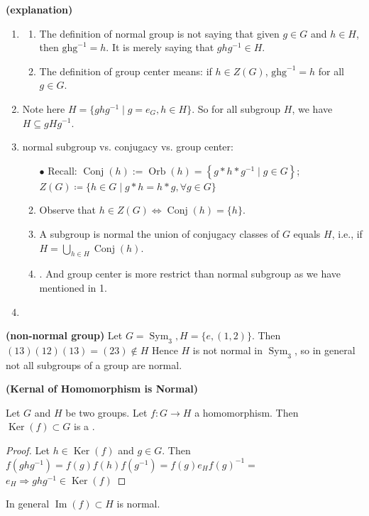 \documentclass{article}
\newcommand{\bfs}[1]{\textbf{({#1}) }}
\newcommand{\Sym}{\operatorname{Sym}}
\newcommand{\Ker}{\operatorname{Ker}}
\newcommand{\Conj}{\operatorname{Conj}}
\begin{document}
\begin{rema}{\bfs{explanation}} \label{rem:idbndadf}

\begin{enumerate} 
    \item \begin{enumerate}
        \item The definition of normal group is not saying that given $g \in G$ and $h \in H$, then $\mathrm{ghg}^{-1}=h$. It is merely saying that  $ghg^{-1} \in H .$ 
\item The definition of  group center means: if $h\in Z(G)$, $\mathrm{ghg}^{-1}=h$ for all $g\in G$.
    \end{enumerate}
\item Note here  $H=\{ghg^{-1}\mid g=e_G,h\in H\}$. So for all subgroup $H$, we have  $H\subseteq gHg^{-1}$.
 \item normal subgroup vs. conjugacy vs.  group center:
 \begin{enumerate}
 \item[$\bullet$] Recall:  $\operatorname{Conj}(h):=\operatorname{Orb}(h)=\left\{g * h * g^{-1} \mid g \in G\right\}$; $Z(G)\coloneqq\{h \in G \mid g * h=h * g, \forall g \in G\}$
 \item  Observe that $h \in Z(G) \Longleftrightarrow \operatorname{Conj}(h)=\{h\} .$
      \item A  subgroup is normal  the union of conjugacy classes of $G$ equals $H$, i.e., if $H=\bigcup_{h\in H}\Conj(h)$. 
    \item {}. And group center is more restrict than normal subgroup as we have mentioned in 1.
 \end{enumerate}
   
    \item {}
\end{enumerate} 
\end{rema} 
\begin{exma}{\bfs{non-normal group}}
 Let $G=\Sym_{3}, H=\{e,(1,2)\} .$ Then $(13)(12)(13)=(23) \notin H$
Hence $H$ is not normal in $\Sym_{3}$, so in general not all subgroups of a group are normal.
\end{exma}
\begin{thma}{\bfs{Kernal of Homomorphism is Normal}}\label{eq:kernnorm}

Let $G$ and $H$ be two groups. Let $f: G \rightarrow H$ a homomorphism. Then $\operatorname{Ker}(f) \subset G$ is a .
\end{thma} 
\begin{proof}
Let $h \in \operatorname{Ker}(f)$ and $g \in G$. Then $f\left(g h g^{-1}\right)=f(g) f(h) f\left(g^{-1}\right)=f(g) e_{H} f(g)^{-1}=$
$e_{H} \Rightarrow g h g^{-1} \in \Ker(f)$
\end{proof} 
\begin{rema}
In general $\operatorname{Im}(f) \subset H$ is  normal.
\end{rema}
\end{document}
